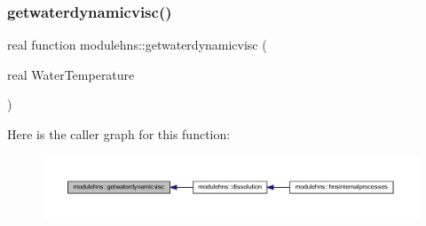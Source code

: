 \subsubsection{\texorpdfstring{getwaterdynamicvisc()}{getwaterdynamicvisc()}}
{\footnotesize\ttfamily real function modulehns\+::getwaterdynamicvisc (\begin{DoxyParamCaption}\item[{real}]{Water\+Temperature }\end{DoxyParamCaption})\hspace{0.3cm}{\ttfamily [private]}}

Here is the caller graph for this function\+:\nopagebreak
\begin{figure}[H]
\begin{center}
\leavevmode
\includegraphics[width=350pt]{namespacemodulehns_a0b9d738b31afba3668603a21335882f9_icgraph}
\end{center}
\end{figure}
\mbox{\label{namespacemodulehns_a6329952c484c367d1190fff3d5a0d951}} 
